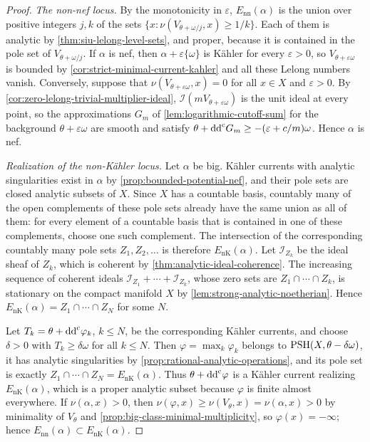 \begin{proof}
\emph{The non-nef locus.} By the monotonicity in $\varepsilon$, $E_{\mathrm{nn}}(\alpha)$ is the union over positive integers $j,k$ of the sets $\{x:\nu(V_{\theta+\omega/j},x)\geq1/k\}$. Each of them is analytic by \cref{thm:siu-lelong-level-sets}, and proper, because it is contained in the pole set of $V_{\theta+\omega/j}$. If $\alpha$ is nef, then $\alpha+\varepsilon\{\omega\}$ is K\"ahler for every $\varepsilon>0$, so $V_{\theta+\varepsilon\omega}$ is bounded by \cref{cor:strict-minimal-current-kahler} and all these Lelong numbers vanish. Conversely, suppose that $\nu(V_{\theta+\varepsilon\omega},x)=0$ for all $x\in X$ and $\varepsilon>0$. By \cref{cor:zero-lelong-trivial-multiplier-ideal}, $\mathcal I(mV_{\theta+\varepsilon\omega})$ is the unit ideal at every point, so the approximations $G_m$ of \cref{lem:logarithmic-cutoff-sum} for the background $\theta+\varepsilon\omega$ are smooth and satisfy $\theta+\mathrm{dd}^{\mathrm{c}} G_m\geq-(\varepsilon+c/m)\omega$. Hence $\alpha$ is nef.

\emph{Realization of the non-K\"ahler locus.} Let $\alpha$ be big. K\"ahler currents with analytic singularities exist in $\alpha$ by \cref{prop:bounded-potential-nef}, and their pole sets are closed analytic subsets of $X$. Since $X$ has a countable basis, countably many of the open complements of these pole sets already have the same union as all of them: for every element of a countable basis that is contained in one of these complements, choose one such complement. The intersection of the corresponding countably many pole sets $Z_1,Z_2,\ldots$ is therefore $E_{\mathrm{nK}}(\alpha)$. Let $\mathcal I_{Z_k}$ be the ideal sheaf of $Z_k$, which is coherent by \cref{thm:analytic-ideal-coherence}. The increasing sequence of coherent ideals $\mathcal I_{Z_1}+\cdots+\mathcal I_{Z_k}$, whose zero sets are $Z_1\cap\cdots\cap Z_k$, is stationary on the compact manifold $X$ by \cref{lem:strong-analytic-noetherian}. Hence $E_{\mathrm{nK}}(\alpha)=Z_1\cap\cdots\cap Z_N$ for some $N$.

Let $T_k=\theta+\mathrm{dd}^{\mathrm{c}}\varphi_k$, $k\leq N$, be the corresponding K\"ahler currents, and choose $\delta>0$ with $T_k\geq\delta\omega$ for all $k\leq N$. Then $\varphi=\max_k\varphi_k$ belongs to $\mathrm{PSH}(X,\theta-\delta\omega)$, it has analytic singularities by \cref{prop:rational-analytic-operations}, and its pole set is exactly $Z_1\cap\cdots\cap Z_N=E_{\mathrm{nK}}(\alpha)$. Thus $\theta+\mathrm{dd}^{\mathrm{c}}\varphi$ is a K\"ahler current realizing $E_{\mathrm{nK}}(\alpha)$, which is a proper analytic subset because $\varphi$ is finite almost everywhere. If $\nu(\alpha,x)>0$, then $\nu(\varphi,x)\geq\nu(V_\theta,x)=\nu(\alpha,x)>0$ by minimality of $V_\theta$ and \cref{prop:big-class-minimal-multiplicity}, so $\varphi(x)=-\infty$; hence $E_{\mathrm{nn}}(\alpha)\subset E_{\mathrm{nK}}(\alpha)$.


\end{proof}
